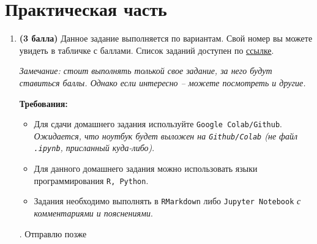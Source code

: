 \documentclass{assignment}
\begin{document}
\section*{Практическая часть}

\begin{enumerate}
    \item \textbf{(3 балла)} Данное задание выполняется по вариантам. Свой номер вы можете увидеть в табличке с баллами. Список заданий доступен по \href{https://drive.google.com/file/d/1AUE3md4TKo0PjZY9W2LFU3uLOUjxeQqI}{ссылке}.
    
    \textit{Замечание: стоит выполнять толькой свое задание, за него будут ставиться баллы. Однако если интересно – можете посмотреть и другие.}
    
    \textbf{Требования:}
    \begin{itemize}
        \item Для сдачи домашнего задания используйте \texttt{Google Colab/Github}. \textit{Ожидается, что ноутбук будет выложен на \texttt{Github/Colab} (не файл \texttt{.ipynb}, присланный куда-либо)}.
        \item Для данного домашнего задания можно использовать языки программирования \texttt{R, Python}.
        \item Задания необходимо выполнять в \texttt{RMarkdown} либо \texttt{Jupyter Notebook} \textit{с комментариями и пояснениями}.
    \end{itemize}
    {\color{white}.}
    \start
    Отправлю позже
    \finish
\end{enumerate}
\end{document}
